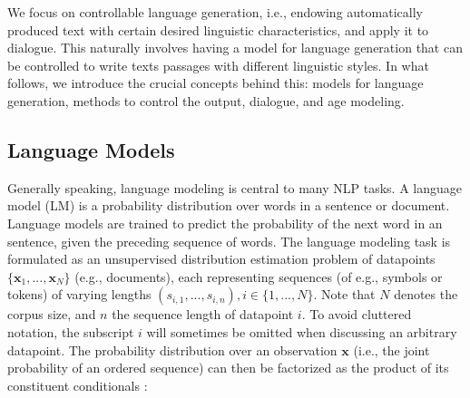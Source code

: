 


We focus on controllable language generation, i.e., endowing automatically produced text with certain desired linguistic characteristics, and apply it to dialogue. This naturally involves having a model for language generation that can be controlled to write texts passages with different linguistic styles. In what follows, we introduce the crucial concepts behind this: models for language generation, methods to control the output, dialogue, and age modeling.


\subsection{Language Models}

Generally speaking, language modeling is central to many NLP tasks. A language model (LM) is a probability distribution over words in a sentence or document. Language models are trained to predict the probability of the next word in an sentence, given the preceding sequence of words. The language modeling task is formulated as an unsupervised distribution estimation problem of datapoints $\{\textbf{x}_1, ..., \textbf{x}_N\}$ (e.g., documents), each representing sequences (of e.g., symbols or tokens) of varying lengths $(s_{i, 1}, ..., s_{i, n}), i \in \{1, ..., N\}$. Note that $N$ denotes the corpus size, and $n$ the sequence length of datapoint $i$. To avoid cluttered notation, the subscript $i$ will sometimes be omitted when discussing an arbitrary datapoint. The probability distribution over an observation $\textbf{x}$  (i.e., the joint probability of an ordered sequence) can then be factorized as the product of its constituent conditionals \citep{radford2019language}:

